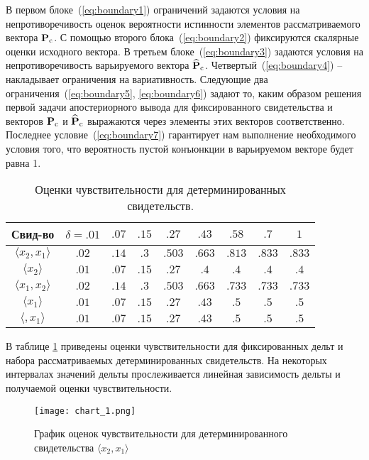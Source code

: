 В первом блоке~(\ref{eq:boundary1}) ограничений задаются условия на непротиворечивость оценок вероятности истинности элементов рассматриваемого вектора $\mathbf{P}_\mathrm{c}$. 
С помощью второго блока~(\ref{eq:boundary2}) фиксируются скалярные оценки исходного вектора. 
В третьем блоке~(\ref{eq:boundary3}) задаются условия на непротиворечивость варьируемого вектора $\mathbf{\widehat{P}}_\mathrm{c}$. Четвертый~(\ref{eq:boundary4}) -- накладывает ограничения на вариативность. 
Следующие два ограничения~(\ref{eq:boundary5}, \ref{eq:boundary6}) задают то, каким образом решения первой задачи апостериорного вывода для фиксированного свидетельства и векторов $\mathbf{P}_\mathrm{c}$ и $\mathbf{\widehat{P}}_\mathrm{c}$ выражаются через элементы этих векторов соответственно. Последнее условие~(\ref{eq:boundary7}) гарантирует нам выполнение необходимого условия того, что вероятность пустой конъюнкции в варьируемом векторе будет равна 1.

\begin{table}[htbp]
\caption{Оценки чувствительности для детерминированных свидетельств.} 
\begin{center}
\begin{tabular}{ |c|c|c|c|c|c|c|c|c| }
\hline
Свид-во &     $\delta= .01$ & $ .07$ & $ .15$ & $.27$ & $.43$ & $.58$ & $.7$ & $1$ \\ \hline
$\langle x_{2}, x_{1} \rangle$ & $.02$ & $.14$ & $.3$ & $.503$ & $.663$ & $.813$ & $.833$ & $.833$ \\
$\langle x_{2} \rangle$ & $.01$ & $.07$ & $.15$ & $.27$ & $.4$ & $.4$ & $.4$ & $.4$ \\
$\langle x_{1}, x_{2} \rangle$ & $.02$ & $.14$ & $.3$ & $.503$ & $.663$ & $.733$ & $.733$ & $.733$ \\
$\langle x_{1} \rangle$ & $.01$ & $.07$ & $.15$ & $.27$ & $.43$ & $.5$ & $.5$ & $.5$ \\
$\langle , x_{1} \rangle$ & $.01$ & $.07$ & $.15$ & $.27$ & $.43$ & $.5$ & $.5$ & $.5$ \\\hline
\end{tabular}
\end{center}
\label{tabular:sense}
\end{table}

В таблице \ref{tabular:sense} приведены оценки чувствительности для фиксированных дельт и набора рассматриваемых детерминированных свидетельств. На некоторых интервалах значений дельты прослеживается линейная зависимость дельты и получаемой оценки чувствительности. 

\begin{figure}[htbp]
\centerline{\texttt{[image: chart\_1.png]}}
\caption{График оценок чувствительности для детерминированного свидетельства  $\langle x_{2}, x_{1} \rangle$}
\label{chart1}
\end{figure}

